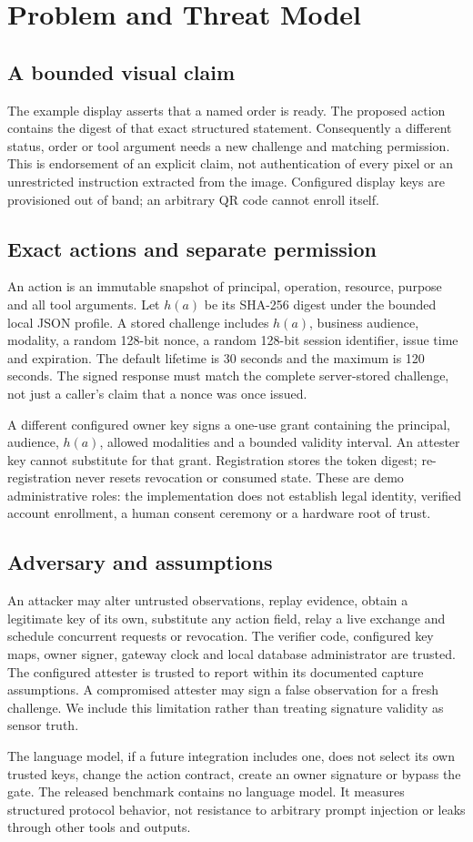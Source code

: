 \section{Problem and Threat Model}
\subsection{A bounded visual claim}
The example display asserts that a named order is ready. The proposed action
contains the digest of that exact structured statement. Consequently a different
status, order or tool argument needs a new challenge and matching permission.
This is endorsement of an explicit claim, not authentication of every pixel or
an unrestricted instruction extracted from the image. Configured display keys
are provisioned out of band; an arbitrary QR code cannot enroll itself.
\subsection{Exact actions and separate permission}
An action is an immutable snapshot of principal, operation, resource, purpose and
all tool arguments. Let $h(a)$ be its SHA-256 digest under the bounded local JSON
profile. A stored challenge includes $h(a)$, business audience, modality, a random
128-bit nonce, a random 128-bit session identifier, issue time and expiration.
The default lifetime is 30 seconds and the maximum is 120 seconds. The signed
response must match the complete server-stored challenge, not just a caller's
claim that a nonce was once issued.

A different configured owner key signs a one-use grant containing the principal,
audience, $h(a)$, allowed modalities and a bounded validity interval. An attester
key cannot substitute for that grant. Registration stores the token digest;
re-registration never resets revocation or consumed state. These are demo
administrative roles: the implementation does not establish legal identity,
verified account enrollment, a human consent ceremony or a hardware root of trust.

\subsection{Adversary and assumptions}
An attacker may alter untrusted observations, replay evidence, obtain a legitimate
key of its own, substitute any action field, relay a live exchange and schedule
concurrent requests or revocation. The verifier code, configured key maps,
owner signer, gateway clock and local database administrator are trusted.
The configured attester is trusted to report within its documented capture
assumptions. A compromised attester may sign a false observation for a fresh
challenge. We include this limitation rather than treating signature validity as
sensor truth.

The language model, if a future integration includes one, does not select its own
trusted keys, change the action contract, create an owner signature or bypass the
gate. The released benchmark contains no language model. It measures structured
protocol behavior, not resistance to arbitrary prompt injection or leaks through
other tools and outputs.

